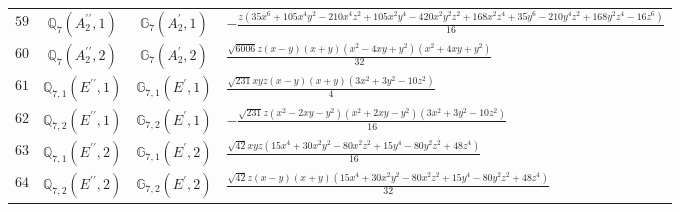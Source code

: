 \documentclass[fleqn,8pt,landscape]{jsarticle}
\begin{document}
\begin{table}[ht!]
\begin{center}
\begin{tabular}{cccl}
$ 59 $ & $ \mathbb{Q}_{7}(A_{2}^{\prime\prime},1) $ & $ \mathbb{G}_{7}(A_{2}^{\prime},1) $ & $ - \frac{z \left(35 x^{6} + 105 x^{4} y^{2} - 210 x^{4} z^{2} + 105 x^{2} y^{4} - 420 x^{2} y^{2} z^{2} + 168 x^{2} z^{4} + 35 y^{6} - 210 y^{4} z^{2} + 168 y^{2} z^{4} - 16 z^{6}\right)}{16} $ \\
$ 60 $ & $ \mathbb{Q}_{7}(A_{2}^{\prime\prime},2) $ & $ \mathbb{G}_{7}(A_{2}^{\prime},2) $ & $ \frac{\sqrt{6006} z \left(x - y\right) \left(x + y\right) \left(x^{2} - 4 x y + y^{2}\right) \left(x^{2} + 4 x y + y^{2}\right)}{32} $ \\
$ 61 $ & $ \mathbb{Q}_{7,1}(E^{\prime\prime},1) $ & $ \mathbb{G}_{7,1}(E^{\prime},1) $ & $ \frac{\sqrt{231} x y z \left(x - y\right) \left(x + y\right) \left(3 x^{2} + 3 y^{2} - 10 z^{2}\right)}{4} $ \\
$ 62 $ & $ \mathbb{Q}_{7,2}(E^{\prime\prime},1) $ & $ \mathbb{G}_{7,2}(E^{\prime},1) $ & $ - \frac{\sqrt{231} z \left(x^{2} - 2 x y - y^{2}\right) \left(x^{2} + 2 x y - y^{2}\right) \left(3 x^{2} + 3 y^{2} - 10 z^{2}\right)}{16} $ \\
$ 63 $ & $ \mathbb{Q}_{7,1}(E^{\prime\prime},2) $ & $ \mathbb{G}_{7,1}(E^{\prime},2) $ & $ \frac{\sqrt{42} x y z \left(15 x^{4} + 30 x^{2} y^{2} - 80 x^{2} z^{2} + 15 y^{4} - 80 y^{2} z^{2} + 48 z^{4}\right)}{16} $ \\
$ 64 $ & $ \mathbb{Q}_{7,2}(E^{\prime\prime},2) $ & $ \mathbb{G}_{7,2}(E^{\prime},2) $ & $ \frac{\sqrt{42} z \left(x - y\right) \left(x + y\right) \left(15 x^{4} + 30 x^{2} y^{2} - 80 x^{2} z^{2} + 15 y^{4} - 80 y^{2} z^{2} + 48 z^{4}\right)}{32} $ \\
 \hline \hline
\end{tabular}
\end{center}
\end{table}
\end{document}
